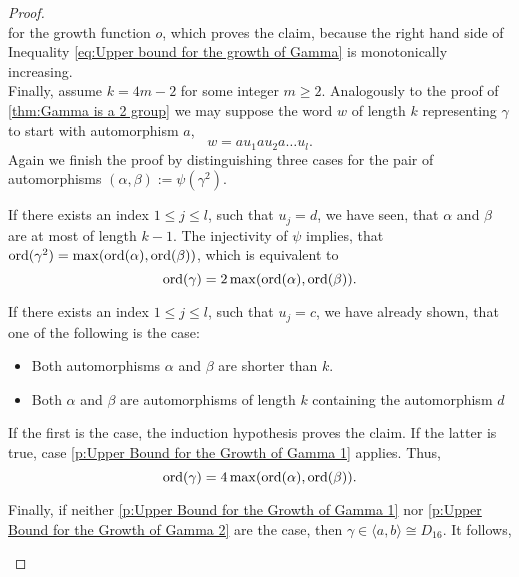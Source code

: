 \begin{proof}
\begin{equation}
\end{equation}
for the growth function $o$, which proves the claim, because the right hand side of Inequality \ref{eq:Upper bound for the growth of Gamma} is monotonically increasing.\\
Finally, assume $k=4m-2$ for some integer $m\geq 2$. Analogously to the proof of  \cref{thm:Gamma is a 2 group} we may suppose the word $w$ of length $k$ representing $\gamma$ to start with automorphism $a$, \ie
\begin{equation*}
w=au_1 a u_2 a\ldots u_l.
\end{equation*}
Again we finish the proof by distinguishing three cases for the pair of automorphisms $(\alpha,\beta):=\psi(\gamma^2)$.
\begin{clist}
\item\label{p:Upper Bound for the Growth of Gamma 1} If there exists an index $1\leq j\leq l$, such that $u_j=d$, we have seen, that $\alpha$ and $\beta$ are at most of length $k-1$. The injectivity of $\psi$ implies, that $\operatorname{\mathrm{ord}}(\gamma^2)=\max(\operatorname{\mathrm{ord}}(\alpha),\operatorname{\mathrm{ord}}(\beta))$, which is equivalent to
\begin{equation}\label{eq:Upper Bound for the Growth of Gamma 1}
\operatorname{\mathrm{ord}}(\gamma)=2\max(\operatorname{\mathrm{ord}}(\alpha), \operatorname{\mathrm{ord}}(\beta)).
\end{equation}
\item\label{p:Upper Bound for the Growth of Gamma 2} If there exists an index $1\leq j\leq l$, such that $u_j=c$, we have already shown, that one of the following is the case:
\begin{itemize}
\item Both automorphisms $\alpha$ and $\beta$ are shorter than $k$.
\item Both $\alpha$ and $\beta$ are automorphisms of length $k$ containing the automorphism $d$
\end{itemize}
If the first is the case, the induction hypothesis proves the claim. If the latter is true, case \ref{p:Upper Bound for the Growth of Gamma 1} applies. Thus,
\begin{equation}\label{eq:Upper Bound for the Growth of Gamma 2}
\operatorname{\mathrm{ord}}(\gamma)=4\max(\operatorname{\mathrm{ord}}(\alpha), \operatorname{\mathrm{ord}}(\beta)).
\end{equation}
\item Finally, if neither \ref{p:Upper Bound for the Growth of Gamma 1} nor \ref{p:Upper Bound for the Growth of Gamma 2} are the case, then $\gamma\in\langle a,b\rangle\cong D_{16}$. It follows,
\begin{equation}\label{eq:Upper Bound for the Growth of Gamma 3}

\end{equation}
\end{clist}
\end{proof}
